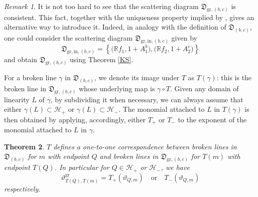 \documentclass[11pt]{amsart}
\newtheorem{theorem}{Theorem}[section]
\theoremstyle{remark}
\newtheorem{remark}[theorem]{Remark}
\numberwithin{equation}{section}
\newcommand{\RR}{\mathbb{R}}
\newcommand{\DD}{\mathfrak{D}}
\newcommand{\gr}{\mathrm{gr}}
\begin{document}
\begin{remark}
  It is not too hard to see that the scattering diagram $\DD_{\gr,(b,c)}$ is
  consistent. This fact, together with the uniqueness property implied by
  \cite[Theorem 1.7]{GHKK}, gives an alternative way to introduce it. Indeed, in
  analogy with the definition of $\DD_{(b,c)}$, one could consider the
  scattering diagram
  $\DD_{\gr,\mathrm{in},(b,c)}$ given by
  \[
    \DD_{\gr,\mathrm{in},(b,c)}=
    \left\{
      \big(\RR f_1, 1+A_1^b\big), 
      \big(\RR f_2, 1+A_2^c\big)
    \right\}
  \]
  and obtain $\DD_{\gr,(b,c)}$ using Theorem \ref{KS}. 
\end{remark}

For a broken line $\gamma$ in $\DD_{(b,c)}$, we denote its image under $T$ as
$T(\gamma)$: this is the broken line in $\DD_{\gr,(b,c)}$ whose underlying map
is $\gamma\circ T$. Given any domain of linearity $L$ of $\gamma$, by
subdividing it when necessary, we can always assume that either $\gamma(L)
\subset \mathcal{H}_{+} $ or $\gamma(L)\subset \mathcal{H}_{-}$. The monomial
attached to $L$ in $T(\gamma)$ is then obtained by applying, accordingly, either
$T_+$ or $T_-$ to the exponent of the monomial attached to $L$ in $\gamma$.

\begin{theorem}
  \label{thm:T_on_broken_lines}
  $T$ defines a one-to-one correspondence between broken lines in $\DD_{(b,c)}$
  for $m$ with endpoint $Q$ and broken lines in $\DD_{\gr,(b,c)}$ for $T(m)$
  with endpoint $T(Q)$. In particular for $Q \in \mathcal{H}_+$ or $\mathcal{H}_-$,
  we have
  \[ 
    \vartheta^{\gr}_{T(Q),T( m)} = 
    T_{+} (\vartheta_{Q, m}) 
    \quad
    \mbox{or} 
    \quad
    T_{-} (\vartheta_{Q, m})
  \]
  respectively.
\end{theorem}
\end{document}
